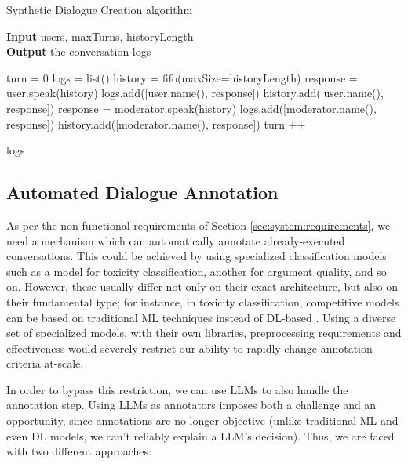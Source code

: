 \begin{algorithm}
	\caption{Synthetic Dialogue Creation algorithm} 
	\label{al::dialogue-creation}
	\hspace*{\algorithmicindent} \textbf{Input} users, maxTurns, historyLength\\
	\hspace*{\algorithmicindent} \textbf{Output} the conversation logs
	\begin{algorithmic}[1]	
		\State turn = 0
		\State logs = list()
		\State history = fifo(maxSize=historyLength)
		\State 
		\State response = user.speak(history)
		\State logs.add([user.name(), response])
		\State history.add([user.name(), response])
		\State
		\State response = moderator.speak(history)
		\State logs.add([moderator.name(), response])
		\State history.add([moderator.name(), response])
		\EndFor
		\State turn ++
		\EndWhile
		
		\State \Return logs
		
	\end{algorithmic} 
\end{algorithm}



\subsection{Automated Dialogue Annotation}
\label{ssec:system:annotation}

As per the non-functional requirements of Section \ref{sec:system:requirements}, we need a mechanism which can automatically annotate already-executed conversations. This could be achieved by using specialized classification models such as a model for toxicity classification, another for argument quality, and so on. However, these usually differ not only on their exact architecture, but also on their fundamental type; for instance, in toxicity classification, competitive models can be based on traditional \ac{ML} techniques instead of \ac{DL}-based \cite{anjum2024hate}. Using a diverse set of specialized models, with their own libraries, preprocessing requirements and effectiveness would severely restrict our ability to rapidly change annotation criteria at-scale. 

In order to bypass this restriction, we can use LLMs to also handle the annotation step. Using LLMs as annotators imposes both a challenge and an opportunity, since annotations are no longer objective (unlike traditional \ac{ML} and even \ac{DL} models, we can't reliably explain a LLM's decision). Thus, we are faced with two different approaches:

